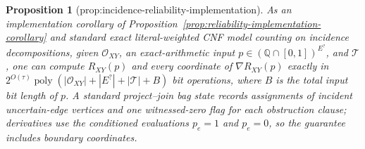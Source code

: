 \documentclass{article}
\newtheorem{proposition}{Proposition}
\begin{document}
\begin{proposition}[prop:incidence-reliability-implementation]\label{prop:incidence-reliability-implementation}
As an implementation corollary of Proposition~\ref{prop:reliability-implementation-corollary} and standard exact literal-weighted CNF model counting on incidence decompositions, given \(\mathcal O_{XY}\), an exact-arithmetic input \(p\in(\mathbb Q\cap[0,1])^{E^{?}}\), and \(\mathcal T\), one can compute \(R_{XY}(p)\) and every coordinate of \(\nabla R_{XY}(p)\) exactly in \(2^{O(\tau)}\operatorname{poly}(|\mathcal O_{XY}|+|E^{?}|+|\mathcal T|+B)\) bit operations, where \(B\) is the total input bit length of \(p\). A standard project--join bag state records assignments of incident uncertain-edge vertices and one witnessed-zero flag for each obstruction clause; derivatives use the conditioned evaluations \(p_e=1\) and \(p_e=0\), so the guarantee includes boundary coordinates.
\end{proposition}
\end{document}
